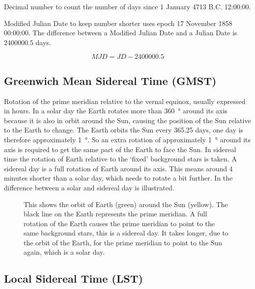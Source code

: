 Decimal number to count the number of days since 1 January 4713 B.C.
12:00:00.

Modified Julian Date to keep number shorter uses epoch 17 November 1858
00:00:00. The difference between a Modified Julian Date and a Julian
Date is 2400000.5 days.

\begin{equation}
    MJD = JD - 2400000.5
\end{equation}


\subsection{Greenwich Mean Sidereal Time (GMST)}

Rotation of the prime meridian relative to the vernal equinox, usually
expressed in hours. In a solar day the Earth rotates more than
\SI{360}{\degree} around its axis because it is also in orbit around the
Sun, causing the position of the Sun relative to the Earth to change.
The Earth orbits the Sun every 365.25 days, one day is therefore
approximately \SI{1}{\degree}. So an extra rotation of approximately
\SI{1}{\degree} around its axis is required to get the same part of the
Earth to face the Sun. In sidereal time the rotation of Earth relative
to the `fixed' background stars is taken. A sidereal day is a full
rotation of Earth around its axis. This means around 4 minutes shorter
than a solar day, which needs to rotate a bit further. In
 the difference between a solar and sidereal
day is illustrated.

\cite{kaplan:2011aa}

\begin{figure}
    \centering
    
    \caption{This shows the orbit of Earth (green) around the Sun
             (yellow). The black line on the Earth represents the prime
             meridian. A full rotation of the Earth causes the prime
             meridian to point to the same background stars, this is a
             sidereal day. It takes longer, due to the orbit of the
             Earth, for the prime meridian to point to the Sun again,
             which is a solar day.}
    \label{fig:sidereal_time}
\end{figure}


\subsection{Local Sidereal Time (LST)}

